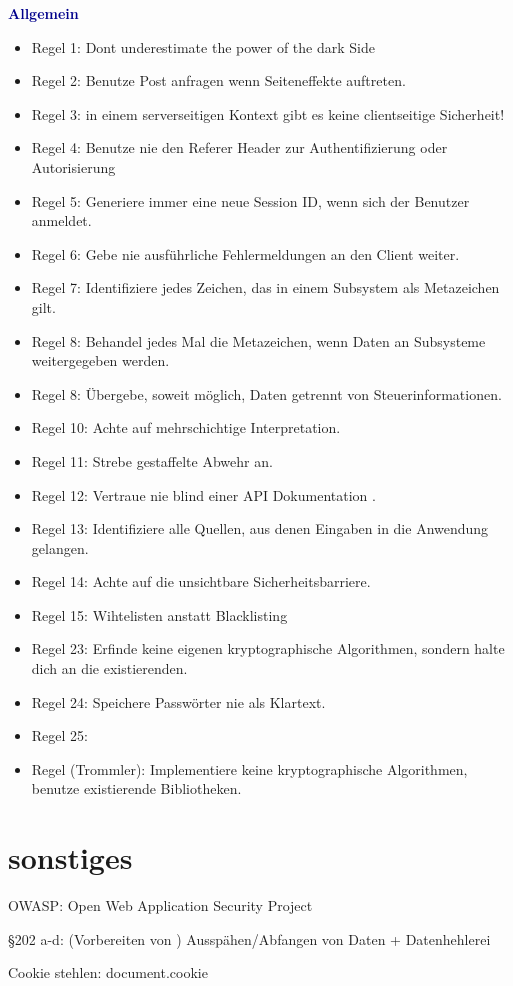 	\textbf{\textcolor{darkblue}{ Allgemein}}~
	\begin{itemize}
	
\item	Regel 1: Dont underestimate the power of the dark Side
\item	Regel 2: Benutze Post anfragen wenn Seiteneffekte auftreten.
\item	Regel 3: in einem serverseitigen Kontext gibt es keine clientseitige Sicherheit!
\item	Regel 4: Benutze nie den Referer Header zur Authentifizierung oder Autorisierung
\item	Regel 5: Generiere immer eine neue Session ID, wenn sich der Benutzer anmeldet.
\item	Regel 6: Gebe nie ausführliche Fehlermeldungen an den Client weiter.
\item	Regel 7: Identifiziere jedes Zeichen, das in einem Subsystem als Metazeichen gilt.
\item	Regel 8: Behandel jedes Mal die Metazeichen, wenn Daten an Subsysteme weitergegeben werden.
\item	Regel 8: Übergebe, soweit möglich, Daten getrennt von Steuerinformationen.
\item	Regel 10: Achte auf mehrschichtige Interpretation.
\item	Regel 11: Strebe gestaffelte Abwehr an.
\item	Regel 12: Vertraue nie blind einer API Dokumentation .
\item	Regel 13: Identifiziere alle Quellen, aus denen Eingaben in die Anwendung gelangen.
\item	Regel 14: Achte auf die unsichtbare Sicherheitsbarriere.
\item	Regel 15: Wihtelisten anstatt Blacklisting
\item	Regel 23: Erfinde keine eigenen kryptographische Algorithmen, sondern halte dich an die existierenden.
\item	Regel 24: Speichere Passwörter nie als Klartext.
\item	Regel 25: 	
\item   Regel (Trommler): Implementiere keine kryptographische Algorithmen, benutze existierende Bibliotheken.

	\end{itemize}
	
	
	
	
	\section{sonstiges}
	OWASP: Open Web Application Security Project
	
	§202 a-d: (Vorbereiten von ) Ausspähen/Abfangen von Daten + Datenhehlerei
	
	Cookie stehlen: document.cookie